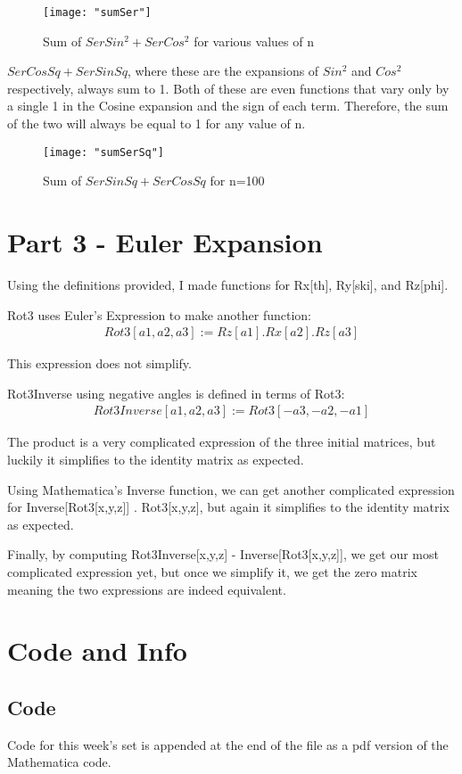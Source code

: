 \documentclass{article}
\begin{document}
\begin{figure}[h!]
	\centering
	\texttt{[image: "sumSer"]}
	\caption{Sum of $SerSin^2 + SerCos^2$ for various values of n}
\end{figure} 
\FloatBarrier

$SerCosSq + SerSinSq$, where these are the expansions of $Sin^2$ and $Cos^2$ respectively, always sum to 1. Both of these are even functions 
that vary only by a single 1 in the Cosine expansion and the sign of each term. Therefore, the sum of the two will always be equal to 1 for any value of n.

\begin{figure}[h!]
	\centering
	\texttt{[image: "sumSerSq"]}
	\caption{Sum of $SerSinSq + SerCosSq$ for n=100}
\end{figure} 
\FloatBarrier

\section{Part 3 - Euler Expansion}

Using the definitions provided, I made functions for Rx[th], Ry[ski], and Rz[phi].

Rot3 uses Euler's Expression to make another function: 
\begin{align*}
	Rot3[a1, a2, a3] := Rz[a1] . Rx[a2] . Rz[a3] 
\end{align*}

This expression does not simplify.

Rot3Inverse using negative angles is defined in terms of Rot3:
\begin{align*}
	Rot3Inverse[a1, a2, a3] := Rot3[-a3, -a2, -a1]
\end{align*}

The product is a very complicated expression of the three initial matrices, but luckily it simplifies to the identity matrix as expected.

Using Mathematica's Inverse function, we can get another complicated expression for Inverse[Rot3[x,y,z]] . Rot3[x,y,z], but again it simplifies
to the identity matrix as expected. 

Finally, by computing Rot3Inverse[x,y,z] - Inverse[Rot3[x,y,z]], we get our most complicated expression yet, but once we simplify it, we
get the zero matrix meaning the two expressions are indeed equivalent.

\section{Code and Info}

\subsection{Code}
Code for this week's set is appended at the end of the file as a pdf version of the Mathematica code.

\end{document}
